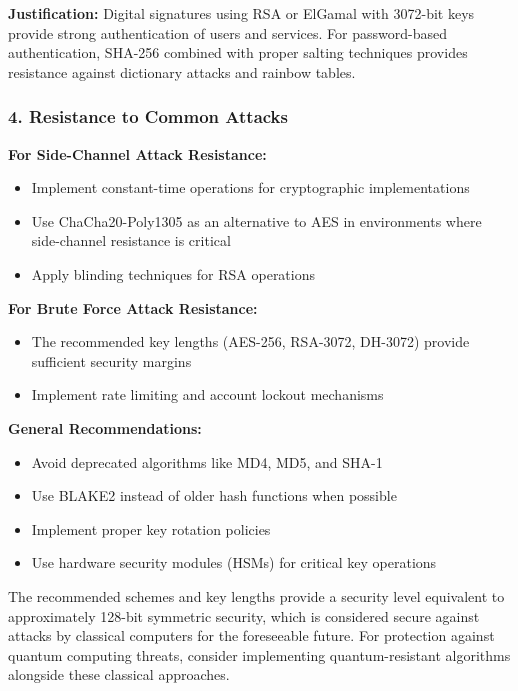 \documentclass{article}
\begin{document}
\begin{enumerate}[label=\textbf{Task \arabic*:}]
\begin{tcolorbox}
		\textbf{Justification:} Digital signatures using RSA or ElGamal with 3072-bit keys provide strong authentication of users and services. For password-based authentication, SHA-256 combined with proper salting techniques provides resistance against dictionary attacks and rainbow tables.
		
		\subsubsection*{4. Resistance to Common Attacks}
		\textbf{For Side-Channel Attack Resistance:}
		\begin{itemize}
			\item Implement constant-time operations for cryptographic implementations
			\item Use ChaCha20-Poly1305 as an alternative to AES in environments where side-channel resistance is critical
			\item Apply blinding techniques for RSA operations
		\end{itemize}
		
		\textbf{For Brute Force Attack Resistance:}
		\begin{itemize}
			\item The recommended key lengths (AES-256, RSA-3072, DH-3072) provide sufficient security margins
			\item Implement rate limiting and account lockout mechanisms
		\end{itemize}
		
		\textbf{General Recommendations:}
		\begin{itemize}
			\item Avoid deprecated algorithms like MD4, MD5, and SHA-1
			\item Use BLAKE2 instead of older hash functions when possible
			\item Implement proper key rotation policies
			\item Use hardware security modules (HSMs) for critical key operations
		\end{itemize}
		
		The recommended schemes and key lengths provide a security level equivalent to approximately 128-bit symmetric security, which is considered secure against attacks by classical computers for the foreseeable future. For protection against quantum computing threats, consider implementing quantum-resistant algorithms alongside these classical approaches.
		\end{tcolorbox}
		

\end{enumerate}
\end{document}
